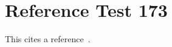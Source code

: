 \documentclass{article}
\begin{document}
\section{Reference Test 173}
This cites a reference~\cite{test173}.

\end{document}

